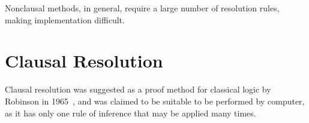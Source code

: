 Nonclausal methods, in general, require a large number of resolution rules,
making implementation difficult.

\section{Clausal Resolution}

Clausal resolution was suggested as a proof method for classical logic by
Robinson in 1965~\cite{Robinson65}, and was claimed to be suitable to be performed
by computer, as it has only one rule of inference that may be applied many
times.
